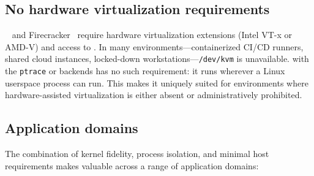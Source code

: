 \subsection{No hardware virtualization requirements}

\KVM{}~\cite{kivity2007} and Firecracker~\cite{agache2020} require hardware
virtualization extensions (Intel VT-x or AMD-V) and access to
.  In many environments---containerized CI/CD runners,
shared cloud instances, locked-down workstations---\texttt{/dev/kvm} is
unavailable.  \UML{} with the \texttt{ptrace} or \Seccomp{} backends has no
such requirement: it runs wherever a Linux userspace process can run.  This
makes it uniquely suited for environments where hardware-assisted
virtualization is either absent or administratively prohibited.

\subsection{Application domains}
\label{sec:intro-applications}

The combination of kernel fidelity, process isolation, and minimal host
requirements makes \UML{} valuable across a range of application domains:

